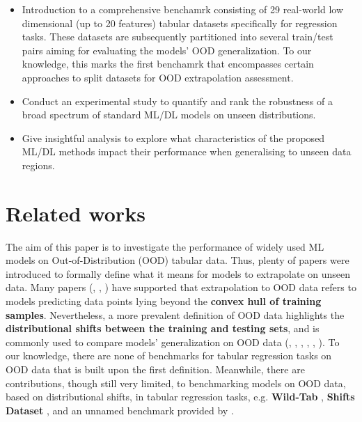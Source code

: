\documentclass[12pt,a4paper]{article}
\theoremstyle{definition}
\theoremstyle{remark}
\begin{document}
\begin{itemize}
  \item Introduction to a comprehensive benchamrk consisting of 29 real-world low dimensional (up to 20 features) tabular datasets specifically for regression tasks.
  These datasets are subsequently partitioned into several train/test pairs aiming for evaluating the models' OOD generalization. To our knowledge, 
  this marks the first benchamrk that encompasses certain approaches to split datasets for OOD extrapolation assessment.
  \item Conduct an experimental study to quantify and rank the robustness of a broad spectrum of standard ML/DL models on unseen distributions.
  \item Give insightful analysis to explore what characteristics of the proposed ML/DL methods impact their performance when generalising to unseen data regions.
\end{itemize}

\section{Related works}
The aim of this paper is to investigate the performance of widely used ML models on Out-of-Distribution (OOD) tabular data.
Thus, plenty of papers were introduced to formally define what it means for models to extrapolate on unseen data.
Many papers (\cite{balestriero2021learninghighdimensionamounts}, \cite{DBLP:journals/corr/abs-2312-16243}, \cite{hwang2024uncertaintymeasurementdeeplearning}) have supported that extrapolation to OOD data refers to models predicting data points lying beyond the \textbf{convex hull of training samples}.
Nevertheless, a more prevalent definition of OOD data highlights the \textbf{distributional shifts between the training and testing sets}, and is commonly used to compare models' generalization on OOD data (\cite{quinonero2009datasetshift}, \cite{malinin2021shifts}, \cite{deeva2023evaluating}, \cite{grinsztajn2022treebasedmodelsoutperformdeep}, \cite{gulrajani2020searchlostdomaingeneralization}, \cite{kolesnikov2023wildtabbenchmarkoutofdistributiongeneralization}).
To our knowledge, there are none of benchmarks for tabular regression tasks on OOD data that is built upon the first definition.
Meanwhile, there are contributions, though still very limited, to benchmarking models on OOD data, based on distributional shifts, in tabular regression tasks, e.g. \textbf{Wild-Tab} \cite{kolesnikov2023wildtabbenchmarkoutofdistributiongeneralization}, \textbf{Shifts Dataset} \cite{malinin2021shifts}, and an unnamed benchmark provided by \cite{grinsztajn2022treebasedmodelsoutperformdeep}.
\\
\end{document}
